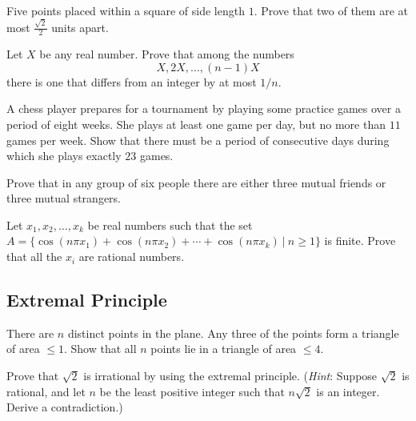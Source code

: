 \documentclass[12pt]{article}
\begin{document}
        \begin{exercise}
             Five points placed within a square of side length $1$. Prove that two of them are at most $\frac{\sqrt{2}}{2}$  units apart.
        \end{exercise}
            
        \begin{exercise}
             Let $X$ be any real number. Prove that among the numbers \[X,2X,\dots,(n-1)X\] there is one that differs from an integer by at most $1/n$. 
        \end{exercise}
            
        \begin{exercise}
            A chess player prepares for a tournament by playing some practice games over a period of eight weeks. She plays at least one game per day, but no more than $11$ games per week. Show that there must be a period of consecutive days during which she plays exactly $23$ games.
        \end{exercise}

        \begin{exercise}
            Prove that in any group of six people there are either three mutual friends or three mutual strangers.
        \end{exercise}

        \begin{exercise}
            Let $x_1,x_2,\dots,x_k$ be real numbers such that the set $A=\{\cos(n\pi x_1)+\cos(n\pi x_2)+\cdots+\cos(n\pi x_k)\  |\  n\geq 1\}$ is finite. Prove that all the $x_i$ are rational numbers.
        \end{exercise}

    \subsection{Extremal Principle}

        \begin{exercise}
            There are $n$ distinct points in the plane. Any three of the points form a triangle of area $\leq 1$. Show that all $n$ points lie in a triangle of area $\leq 4$. 
        \end{exercise}

        \begin{exercise}
            Prove that $\sqrt{2}$ is irrational by using the extremal principle. (\emph{Hint}: Suppose $\sqrt{2}$ is rational, and let $n$ be the least positive integer such that $n\sqrt{2}$ is an integer. Derive a contradiction.)
        \end{exercise}
        
\end{document}
